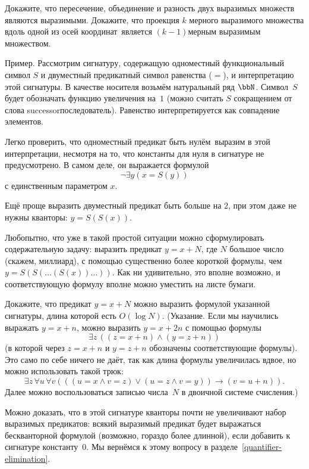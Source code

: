 \begin{problem}
Докажите, что пересечение, объединение и разность двух выразимых
множеств являются выразимыми. Докажите, что проекция $k$\д
мерного выразимого множества вдоль одной из  осей
координат\ является $(k-1)$\д мерным выразимым множеством.
\end{problem}


\textsf{Пример}.  Рассмотрим сигнатуру, содержащую одноместный
функциональный символ $S$ и двуместный предикатный символ
равенства ($=$), и интерпретацию этой сигнатуры. В
качестве носителя возьмём натуральный ряд $\bbN$. Символ~$S$
будет обозначать функцию увеличения на~$1$ (можно считать $S$
сокращением от слова successor\т последователь).  Равенство
интерпретируется как совпадение элементов.

Легко проверить, что одноместный предикат  быть нулём\
выразим в этой интерпретации, несмотря на то, что константы для
нуля в сигнатуре не предусмотрено. В самом деле, он выражается
формулой
        $$
\lnot\exists y (x=S(y))
        $$
с единственным параметром $x$.

Ещё проще выразить двуместный предикат  быть
больше на $2$, при этом даже не нужны кванторы: $y=S(S(x))$.

Любопытно, что уже в такой простой ситуации можно сформулировать
содержательную задачу: выразить предикат $y=x+N$, где $N$\т
большое число (скажем, миллиард), с помощью существенно более
короткой формулы, чем $y=S(S(\dots(S(x))\dots))$. Как ни
удивительно, это вполне возможно, и соответствующую формулу
вполне можно уместить на листе бумаги.
\begin{problem}
Докажите, что предикат $y=x+N$ можно выразить формулой указанной
сигнатуры, длина которой есть $O(\log N)$. (Указание. Если мы
научились выражать $y=x+n$, можно выразить $y=x+2n$ с помощью
формулы
        $$
\exists z\, ((z=x+n)\land(y=z+n))
        $$
(в которой через $z=x+n$ и $y=z+n$ обозначены соответствующие
формулы). Это само по себе ничего не даёт, так как длина
формулы увеличилась вдвое, но можно использовать такой трюк:
        $$
\exists z\, \forall u\,\forall v
(((u=x\land v=z)\lor(u=z\land v=y))\to(v=u+n)).
        $$
Далее можно воспользоваться записью числа~$N$ в двоичной системе
счисления.)
\end{problem}

Можно доказать, что в этой сигнатуре кванторы почти не увеличивают
набор выразимых предикатов: всякий выразимый предикат будет выражаться
бескванторной формулой (возможно, гораздо более длинной),
если добавить к сигнатуре константу~$0$.
Мы вернёмся к этому вопросу в разделе~\ref{quantifier-elimination}.

